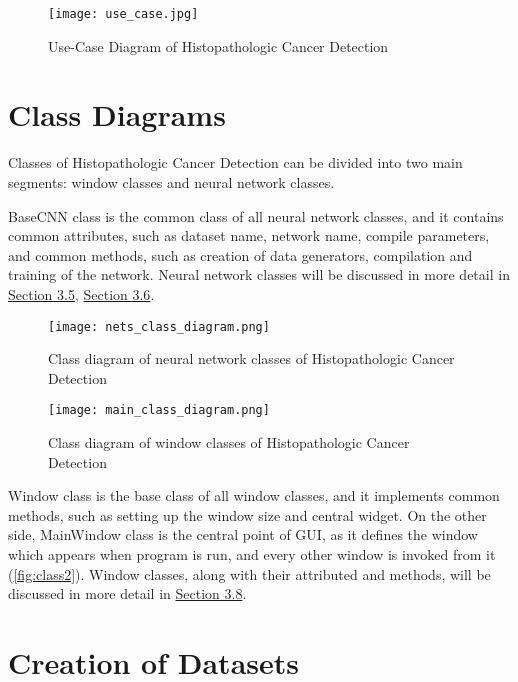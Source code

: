\begin{figure}[h]
	\centering
	\texttt{[image: use\_case.jpg]}
	\caption{Use-Case Diagram of Histopathologic Cancer Detection}
	\label{fig:usecase}
\end{figure}

\section{Class Diagrams}

Classes of Histopathologic Cancer Detection can be divided into two main segments: window classes and neural network classes.

BaseCNN class is the common class of all neural network classes, and it contains common attributes, such as dataset name, network name, compile parameters, and common methods, such as creation of data generators, compilation and training of the network. Neural network classes will be discussed in more detail in \textcolor{red}{\hyperref[cnn]{Section 3.5}, \hyperref[vgg19]{Section 3.6}}.

\begin{figure}[h]
	\centering
	\texttt{[image: nets\_class\_diagram.png]}
	\caption{Class diagram of neural network classes of Histopathologic Cancer Detection}
	\label{fig:class1}
\end{figure}

\begin{figure}
	\centering
	\texttt{[image: main\_class\_diagram.png]}
	\caption{Class diagram of window classes of Histopathologic Cancer Detection}
	\label{fig:class2}
\end{figure}

Window class is the base class of all window classes, and it implements common methods, such as setting up the window size and central widget. On the other side, MainWindow class is the central point of GUI, as it defines the window which appears when program is run, and every other window is invoked from it (\textcolor{red}{\autoref{fig:class2}}). Window classes, along with their attributed and methods, will be discussed in more detail in \textcolor{red}{\hyperref[gui]{Section 3.8}}.

\section{Creation of Datasets}
\label{createdata}

